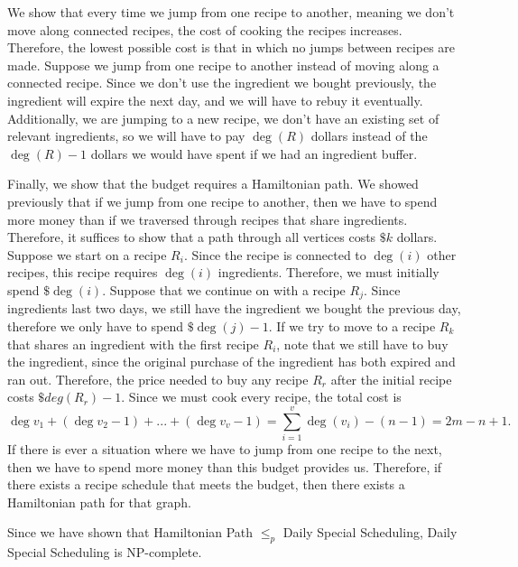\documentclass[oneside, 12pt]{article}
\begin{document}
\begin{enumerate}
We show that every time we jump from one recipe to another, meaning we don't move along connected recipes, the cost of cooking the recipes increases. Therefore, the lowest possible cost is that in which no jumps between recipes are made. Suppose we jump from one recipe to another instead of moving along a connected recipe. Since we don't use the ingredient we bought previously, the ingredient will expire the next day, and we will have to rebuy it eventually. Additionally, we are jumping to a new recipe, we don't have an existing set of relevant ingredients, so we will have to pay $\deg(R)$ dollars instead of the $\deg(R) - 1$ dollars we would have spent if we had an ingredient buffer. 

Finally, we show that the budget requires a Hamiltonian path. We showed previously that if we jump from one recipe to another, then we have to spend more money than if we traversed through recipes that share ingredients. Therefore, it suffices to show that a path through all vertices costs $\$k$ dollars. Suppose we start on a recipe $R_i$. Since the recipe is connected to $\deg(i)$ other recipes, this recipe requires $\deg(i)$ ingredients. Therefore, we must initially spend $\$\deg(i)$. Suppose that we continue on with a recipe $R_j$. Since ingredients last two days, we still have the ingredient we bought the previous day, therefore we only have to spend $\$\deg(j) - 1$. If we try to move to a recipe $R_k$ that shares an ingredient with the first recipe $R_i$, note that we still have to buy the ingredient, since the original purchase of the ingredient has both expired and ran out. Therefore, the price needed to buy any recipe $R_r$ after the initial recipe costs $\$deg(R_r) - 1$. Since we must cook every recipe, the total cost is
$$ \deg{v_1} + (\deg{v_2} - 1) + ... + (\deg{v_v} - 1) = \sum_{i=1}^v \deg(v_i) - (n - 1) = 2m - n + 1.$$
If there is ever a situation where we have to jump from one recipe to the next, then we have to spend more money than this budget provides us. Therefore, if there exists a recipe schedule that meets the budget, then there exists a Hamiltonian path for that graph. 

Since we have shown that Hamiltonian Path $\le_p$ Daily Special Scheduling, Daily Special Scheduling is NP-complete. 
\end{enumerate}
\end{document}
